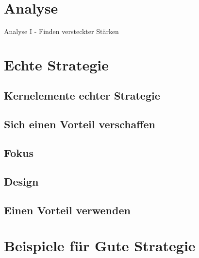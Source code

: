 \documentclass[12pt,compress,ngerman,utf8,t]{beamer}
\begin{document}
\section{Analyse}
\begin{frame}{Analyse I - Finden versteckter Stärken}
\end{frame}



\section{Echte Strategie}
\subsection{Kernelemente echter Strategie}
\subsection{Sich einen Vorteil verschaffen}
\subsection{Fokus}
\subsection{Design}
\subsection{Einen Vorteil verwenden}



\section{Beispiele für Gute Strategie}
\end{document}
